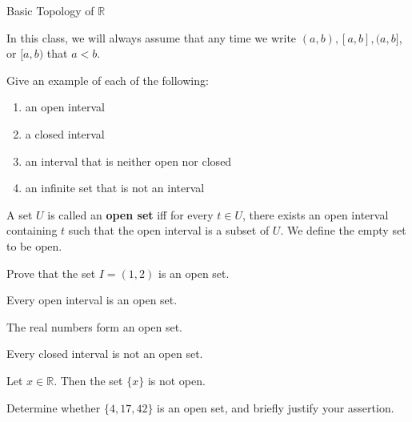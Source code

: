 \begin{section}{Basic Topology of $\mathbb{R}$}
\begin{remark} 
In this class, we will always assume that any time we write $(a,b), [a,b], (a,b]$, or $[a,b)$ that $a<b$. 
\end{remark}

\begin{exercise} Give an example of each of the following:
\begin{enumerate}
\item an open interval
\item a closed interval
\item an interval that is neither open nor closed
\item an infinite set that is not an interval
\end{enumerate}
\end{exercise}

\begin{definition}
A set $U$ is called an \textbf{open set} iff for every $t \in U$, there exists an open interval containing $t$ such that the open interval is a subset of $U$.  We define the empty set to be open.\end{definition}


\begin{problem} 
Prove that the set $I=(1,2)$ is an open set.
\end{problem}

\begin{theorem}[*]
Every open interval is an open set. 
\end{theorem}

\begin{theorem}
The real numbers form an open set.
\end{theorem}

\begin{theorem}[*]
Every closed interval is not an open set.
\end{theorem}

\begin{theorem}
Let $x\in\mathbb{R}$.  Then the set $\{x\}$ is not open.
\end{theorem}

\begin{exercise} 
Determine whether $\{4,17,42\}$ is an open set, and briefly justify your assertion. 
\end{exercise}


\end{section}

